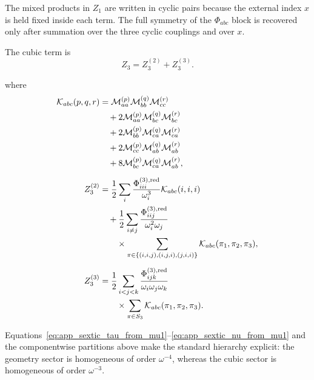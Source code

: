 The mixed products in $Z_1$ are written in cyclic pairs because the
external index $x$ is held fixed inside each term. The full symmetry of
the $\Phi_{abc}$ block is recovered only after summation over the three
cyclic couplings and over $x$.

The cubic term is
\begin{equation}
Z_3=Z_3^{(2)}+Z_3^{(3)}.
\end{equation}

where
\begin{align}
\mathcal{K}_{abc}(p,q,r)
&=
\mathcal{M}^{(p)}_{aa}\mathcal{M}^{(q)}_{bb}\mathcal{M}^{(r)}_{cc}
\notag\\
&\quad
+2\mathcal{M}^{(p)}_{aa}\mathcal{M}^{(q)}_{bc}\mathcal{M}^{(r)}_{bc}
\notag\\
&\quad
+2\mathcal{M}^{(p)}_{bb}\mathcal{M}^{(q)}_{ca}\mathcal{M}^{(r)}_{ca}
\notag\\
&\quad
+2\mathcal{M}^{(p)}_{cc}\mathcal{M}^{(q)}_{ab}\mathcal{M}^{(r)}_{ab}
\notag\\
&\quad
+8\mathcal{M}^{(p)}_{bc}\mathcal{M}^{(q)}_{ca}\mathcal{M}^{(r)}_{ab},
\\[6pt]
Z_3^{(2)}
&=
\frac{1}{2}\sum_i
\frac{\Phi^{(3),\mathrm{red}}_{iii}}{\omega_i^3}
\mathcal{K}_{abc}(i,i,i)
\notag\\
&\quad
+\frac{1}{2}\sum_{i\neq j}
\frac{\Phi^{(3),\mathrm{red}}_{iij}}{\omega_i^2\omega_j}
\notag\\
&\qquad \times
\sum_{\pi\in\{(i,i,j),(i,j,i),(j,i,i)\}}
\mathcal{K}_{abc}(\pi_1,\pi_2,\pi_3),
\\[6pt]
Z_3^{(3)}
&=
\frac{1}{2}\sum_{i<j<k}
\frac{\Phi^{(3),\mathrm{red}}_{ijk}}{\omega_i\omega_j\omega_k}
\notag\\
&\qquad \times
\sum_{\pi\in S_3}
\mathcal{K}_{abc}(\pi_1,\pi_2,\pi_3).
\end{align}

Equations~\eqref{eq:app_sextic_tau_from_mu1}--\eqref{eq:app_sextic_nu_from_mu1}
and the componentwise partitions above make the standard hierarchy explicit:
the geometry sector is homogeneous of order $\omega^{-4}$, whereas the cubic
sector is homogeneous of order $\omega^{-3}$.
